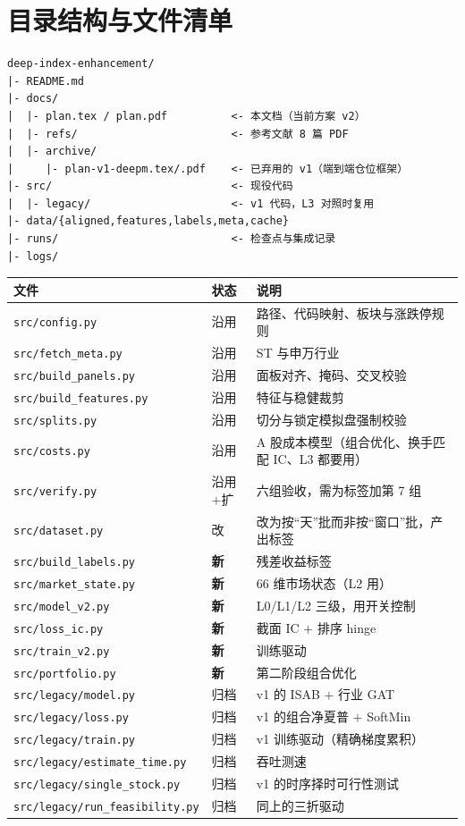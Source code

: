\documentclass[11pt, a4paper]{ctexart}
\newcommand{\file}[1]{\texttt{\small #1}}
\begin{document}
\section{目录结构与文件清单}

\begin{lstlisting}
deep-index-enhancement/
|- README.md
|- docs/
|  |- plan.tex / plan.pdf          <- 本文档（当前方案 v2）
|  |- refs/                        <- 参考文献 8 篇 PDF
|  |- archive/
|     |- plan-v1-deepm.tex/.pdf    <- 已弃用的 v1（端到端仓位框架）
|- src/                            <- 现役代码
|  |- legacy/                      <- v1 代码，L3 对照时复用
|- data/{aligned,features,labels,meta,cache}
|- runs/                           <- 检查点与集成记录
|- logs/
\end{lstlisting}

\begin{center}
\small
\begin{tabular}{lll}
\toprule
文件 & 状态 & 说明 \\
\midrule
\file{src/config.py} & 沿用 & 路径、代码映射、板块与涨跌停规则 \\
\file{src/fetch\_meta.py} & 沿用 & ST 与申万行业 \\
\file{src/build\_panels.py} & 沿用 & 面板对齐、掩码、交叉校验 \\
\file{src/build\_features.py} & 沿用 & 特征与稳健裁剪 \\
\file{src/splits.py} & 沿用 & 切分与锁定模拟盘强制校验 \\
\file{src/costs.py} & 沿用 & A 股成本模型（组合优化、换手匹配 IC、L3 都要用） \\
\file{src/verify.py} & 沿用$+$扩 & 六组验收，需为标签加第 7 组 \\
\file{src/dataset.py} & 改 & 改为按“天”批而非按“窗口”批，产出标签 \\
\midrule
\file{src/build\_labels.py} & \textbf{新} & 残差收益标签 \\
\file{src/market\_state.py} & \textbf{新} & 66 维市场状态（L2 用） \\
\file{src/model\_v2.py} & \textbf{新} & L0/L1/L2 三级，用开关控制 \\
\file{src/loss\_ic.py} & \textbf{新} & 截面 IC $+$ 排序 hinge \\
\file{src/train\_v2.py} & \textbf{新} & 训练驱动 \\
\file{src/portfolio.py} & \textbf{新} & 第二阶段组合优化 \\
\midrule
\file{src/legacy/model.py} & 归档 & v1 的 ISAB $+$ 行业 GAT \\
\file{src/legacy/loss.py} & 归档 & v1 的组合净夏普 $+$ SoftMin \\
\file{src/legacy/train.py} & 归档 & v1 训练驱动（精确梯度累积） \\
\file{src/legacy/estimate\_time.py} & 归档 & 吞吐测速 \\
\file{src/legacy/single\_stock.py} & 归档 & v1 的时序择时可行性测试 \\
\file{src/legacy/run\_feasibility.py} & 归档 & 同上的三折驱动 \\
\bottomrule
\end{tabular}
\end{center}
\end{document}
